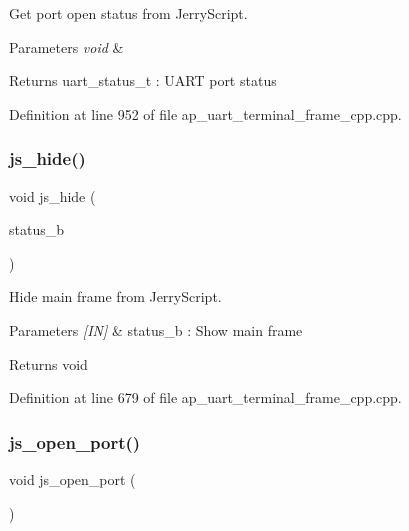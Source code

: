 Get port open status from Jerry\+Script. 


\begin{DoxyParams}{Parameters}
{\em void} & \\
\hline
\end{DoxyParams}
\begin{DoxyReturn}{Returns}
uart\+\_\+status\+\_\+t \+: U\+A\+RT port status 
\end{DoxyReturn}


Definition at line 952 of file ap\+\_\+uart\+\_\+terminal\+\_\+frame\+\_\+cpp.\+cpp.

\mbox{\label{group___u_a_r_t__terminal_ga53cd6502b8c3af665a81501c82b98718}} 
\subsubsection{js\_hide()}
{\footnotesize\ttfamily void js\+\_\+hide (\begin{DoxyParamCaption}\item[{bool}]{status\+\_\+b }\end{DoxyParamCaption})}



Hide main frame from Jerry\+Script. 


\begin{DoxyParams}{Parameters}
{\em \mbox{[}\+I\+N\mbox{]}} & status\+\_\+b \+: Show main frame \\
\hline
\end{DoxyParams}
\begin{DoxyReturn}{Returns}
void 
\end{DoxyReturn}


Definition at line 679 of file ap\+\_\+uart\+\_\+terminal\+\_\+frame\+\_\+cpp.\+cpp.

\mbox{\label{group___u_a_r_t__terminal_gaf8d7fad0f508420ed9b9642b3152cba9}} 
\subsubsection{js\_open\_port()}
{\footnotesize\ttfamily void js\+\_\+open\+\_\+port (\begin{DoxyParamCaption}\item[{void}]{ }\end{DoxyParamCaption})}



